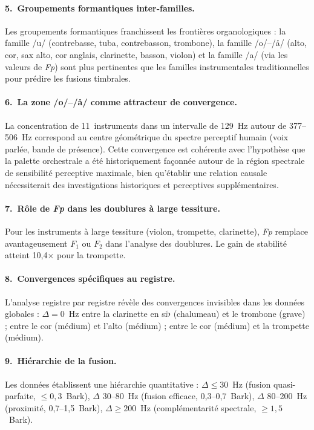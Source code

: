 \documentclass[12pt,a4paper]{article}
\begin{document}
\paragraph{5.\ Groupements formantiques inter-familles.}
Les groupements formantiques franchissent les frontières organologiques : la famille
/u/ (contrebasse, tuba, contrebasson, trombone), la famille /o/--/\aa/ (alto, cor,
sax alto, cor anglais, clarinette, basson, violon) et la famille /a/ (via les valeurs
de \textit{Fp}) sont plus pertinentes que les familles instrumentales traditionnelles
pour prédire les fusions timbrales.

\paragraph{6.\ La zone /o/--/\aa/ comme attracteur de convergence.}
La concentration de 11~instruments dans un intervalle de 129~Hz autour de 377--506~Hz
correspond au centre géométrique du spectre perceptif humain (voix parlée, bande de
présence). Cette convergence est cohérente avec l'hypothèse que la palette orchestrale
a été historiquement façonnée autour de la région spectrale de sensibilité perceptive
maximale, bien qu'établir une relation causale nécessiterait des investigations
historiques et perceptives supplémentaires.

\paragraph{7.\ Rôle de \textit{Fp} dans les doublures à large tessiture.}
Pour les instruments à large tessiture (violon, trompette, clarinette), \textit{Fp}
remplace avantageusement $F_1$ ou $F_2$ dans l'analyse des doublures. Le gain de
stabilité atteint 10,4$\times$ pour la trompette.

\paragraph{8.\ Convergences spécifiques au registre.}
L'analyse registre par registre révèle des convergences invisibles dans les données
globales : $\Delta = 0$~Hz entre la clarinette en si$\flat$ (chalumeau) et le
trombone (grave) ; entre le cor (médium) et l'alto (médium) ; entre le cor (médium)
et la trompette (médium).

\paragraph{9.\ Hiérarchie de la fusion.}
Les données établissent une hiérarchie quantitative : $\Delta \leq 30$~Hz (fusion
quasi-parfaite, $\leq 0,3$~Bark), $\Delta$ 30--80~Hz (fusion efficace, 0,3--0,7~Bark),
$\Delta$ 80--200~Hz (proximité, 0,7--1,5~Bark), $\Delta \geq 200$~Hz (complémentarité
spectrale, $\geq 1,5$~Bark).
\end{document}
